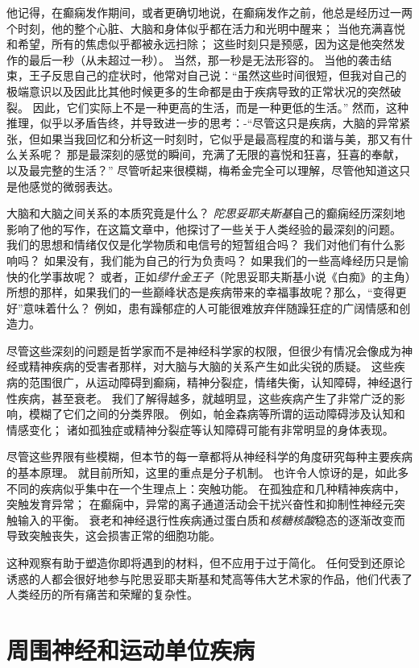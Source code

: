 他记得，在癫痫发作期间，或者更确切地说，在癫痫发作之前，他总是经历过一两个时刻，他的整个心脏、大脑和身体似乎都在活力和光明中醒来；
当他充满喜悦和希望，所有的焦虑似乎都被永远扫除；
这些时刻只是预感，因为这是他突然发作的最后一秒（从未超过一秒）。
当然，那一秒是无法形容的。
当他的袭击结束，王子反思自己的症状时，他常对自己说：“虽然这些时间很短，但我对自己的极端意识以及因此比其他时候更多的生命都是由于疾病导致的正常状况的突然破裂。
因此，它们实际上不是一种更高的生活，而是一种更低的生活。”
然而，这种推理，似乎以矛盾告终，并导致进一步的思考：-“尽管这只是疾病，大脑的异常紧张，但如果当我回忆和分析这一时刻时，它似乎是最高程度的和谐与美，那又有什么关系呢？
那是最深刻的感觉的瞬间，充满了无限的喜悦和狂喜，狂喜的奉献，以及最完整的生活？”
尽管听起来很模糊，梅希金完全可以理解，尽管他知道这只是他感觉的微弱表达。


大脑和大脑之间关系的本质究竟是什么？
\textit{陀思妥耶夫斯基}自己的癫痫经历深刻地影响了他的写作，在这篇文章中，他探讨了一些关于人类经验的最深刻的问题。
我们的思想和情绪仅仅是化学物质和电信号的短暂组合吗？
我们对他们有什么影响吗？
如果没有，我们能为自己的行为负责吗？
如果我们的一些高峰经历只是愉快的化学事故呢？
或者，正如\textit{缪什金王子}（陀思妥耶夫斯基小说《白痴》的主角）所想的那样，如果我们的一些巅峰状态是疾病带来的幸福事故呢？那么，“变得更好”意味着什么？
例如，患有躁郁症的人可能很难放弃伴随躁狂症的广阔情感和创造力。


尽管这些深刻的问题是哲学家而不是神经科学家的权限，但很少有情况会像成为神经或精神疾病的受害者那样，对大脑与大脑的关系产生如此尖锐的质疑。
这些疾病的范围很广，从运动障碍到癫痫，精神分裂症，情绪失衡，认知障碍，神经退行性疾病，甚至衰老。
我们了解得越多，就越明显，这些疾病产生了非常广泛的影响，模糊了它们之间的分类界限。
例如，帕金森病等所谓的运动障碍涉及认知和情感变化；
诸如孤独症或精神分裂症等认知障碍可能有非常明显的身体表现。


尽管这些界限有些模糊，但本节的每一章都将从神经科学的角度研究每种主要疾病的基本原理。
就目前所知，这里的重点是分子机制。
也许令人惊讶的是，如此多不同的疾病似乎集中在一个生理点上：突触功能。
在孤独症和几种精神疾病中，突触发育异常；
在癫痫中，异常的离子通道活动会干扰兴奋性和抑制性神经元突触输入的平衡。
衰老和神经退行性疾病通过蛋白质和\textit{核糖核酸}稳态的逐渐改变而导致突触丧失，这会损害正常的细胞功能。


这种观察有助于塑造你即将遇到的材料，但不应用于过于简化。
任何受到还原论诱惑的人都会很好地参与陀思妥耶夫斯基和梵高等伟大艺术家的作品，他们代表了人类经历的所有痛苦和荣耀的复杂性。




\chapter{周围神经和运动单位疾病} \label{chap:chap57}

